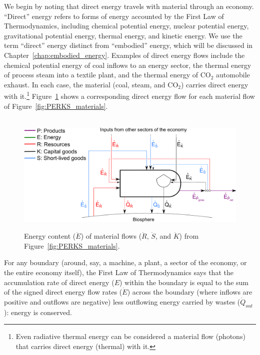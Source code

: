 We begin by noting that direct energy travels 
with material through an economy.
``Direct'' energy refers to forms of energy accounted by the 
First Law of Thermodynamics,
including chemical potential energy, 
nuclear potential energy, 
gravitational potential energy,
thermal energy, 
and kinetic energy.
We use the term ``direct'' energy distinct from ``embodied'' energy, 
which will be discussed in Chapter~\ref{chap:embodied_energy}.
Examples of direct energy flows include 
the chemical potential energy of coal inflows to an energy sector, 
the thermal energy of process steam into a textile plant, and
the thermal energy of CO$_2$ automobile exhaust.
In each case, the material (coal, steam, and CO$_2$) 
carries direct energy with it.\footnote{Even 
radiative thermal energy
can be considered a material flow (photons) that carries
direct energy (thermal) with it.}
Figure~\ref{fig:PERKS_energy_content} shows a corresponding 
direct energy flow for each material flow of Figure~\ref{fig:PERKS_materials}.

\begin{figure}[!ht]
\centering\
\includegraphics[width=0.8\linewidth]{Part_1/Chapter_Energy/images/PERKS_basic_unit_energy_content.pdf}
\caption[Energy content of material flows for a single sector]{Energy content ($\dot{E}$) of material flows 
($\dot{R}$, $\dot{S}$, and $\dot{K}$) 
from Figure~\ref{fig:PERKS_materials}.}
\label{fig:PERKS_energy_content}
\end{figure}

For any boundary (around, say, a machine, a plant,
a sector of the economy, or the entire economy itself), 
the First Law of Thermodynamics says that 
the accumulation rate 
of direct energy ($E$)
within the boundary
is equal to the sum of the signed direct energy flow rates 
($\dot{E}$)
across the boundary (where inflows are positive and outflows are negative)
less outflowing energy carried by wastes 
($\dot{Q}_{out}$): 
energy is conserved.

